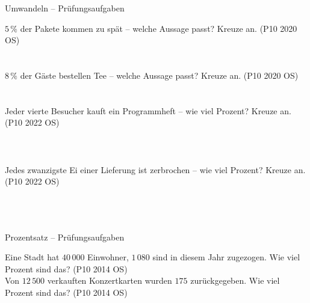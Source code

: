 \setcounter{aufgabe}{9}

\begin{aufgabe}{Umwandeln – Prüfungsaufgaben}
\begin{teile}
\teil $5\,\%$ der Pakete kommen zu spät – welche Aussage passt? Kreuze an. \hfill (P10 2020 OS)\\ \\ \\ 
\teil $8\,\%$ der Gäste bestellen Tee – welche Aussage passt? Kreuze an. \hfill (P10 2020 OS)\\ \\ \\ 
\teil Jeder vierte Besucher kauft ein Programmheft – wie viel Prozent? Kreuze an. \hfill (P10 2022 OS)\\ \\ \\ \\ 
\teil Jedes zwanzigste Ei einer Lieferung ist zerbrochen – wie viel Prozent? Kreuze an. \hfill (P10 2022 OS)\\ \\ \\ \\ 
\end{teile}
\end{aufgabe}

\begin{aufgabe}{Prozentsatz – Prüfungsaufgaben}
\begin{teile}
\teil Eine Stadt hat $40\,000$ Einwohner, $1\,080$ sind in diesem Jahr zugezogen. Wie viel Prozent sind das? \hfill (P10 2014 OS) \\ \leerfeld[\%]
\teil Von $12\,500$ verkauften Konzertkarten wurden $175$ zurückgegeben. Wie viel Prozent sind das? \hfill (P10 2014 OS) \\ \leerfeld[\%]
\end{teile}
\end{aufgabe}

